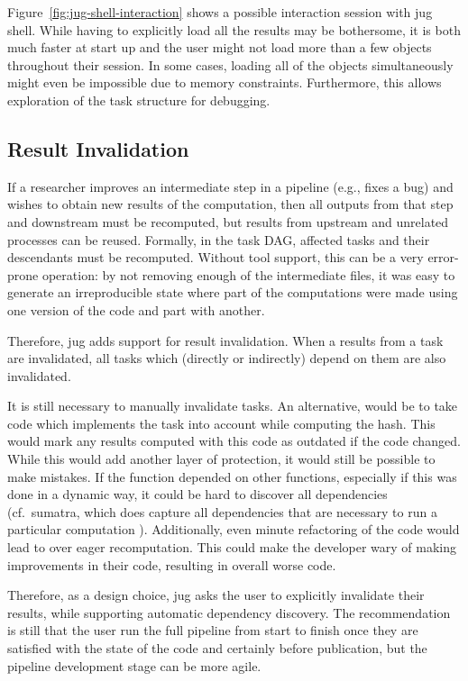 \documentclass{article}
\begin{document}
Figure~\ref{fig:jug-shell-interaction} shows a possible interaction session
with jug shell. While having to explicitly load all the results may be
bothersome, it is both much faster at start up and the user might not load more
than a few objects throughout their session. In some cases, loading all of the
objects simultaneously might even be impossible due to memory constraints.
Furthermore, this allows exploration of the task structure for debugging.

\subsection{Result Invalidation}

If a researcher improves an intermediate step in a pipeline (e.g., fixes a bug)
and wishes to obtain new results of the computation, then all outputs from that
step and downstream must be recomputed, but results from upstream and unrelated
processes can be reused. Formally, in the task DAG, affected tasks and their
descendants must be recomputed. Without tool support, this can be a very
error-prone operation: by not removing enough of the intermediate files, it was
easy to generate an irreproducible state where part of the computations were
made using one version of the code and part with another.

Therefore, jug adds support for result invalidation. When a results from a task
are invalidated, all tasks which (directly or indirectly) depend on them are
also invalidated.

It is still necessary to manually invalidate tasks. An alternative, would be to
take code which implements the task into account while computing the hash. This
would mark any results computed with this code as outdated if the code changed.
While this would add another layer of protection, it would still be possible to
make mistakes. If the function depended on other functions, especially if this
was done in a dynamic way, it could be hard to discover all dependencies (cf.\
sumatra, which does capture all dependencies that are necessary to run a
particular computation \citep{davison2012automated}). Additionally, even minute
refactoring of the code would lead to over eager recomputation. This could make
the developer wary of making improvements in their code, resulting in overall
worse code.

Therefore, as a design choice, jug asks the user to explicitly invalidate their
results, while supporting automatic dependency discovery. The recommendation is
still that the user run the full pipeline from start to finish once they are
satisfied with the state of the code and certainly before publication, but the
pipeline development stage can be more agile.
\end{document}
